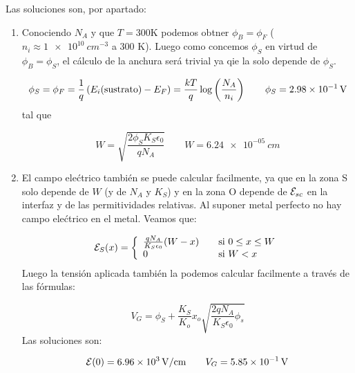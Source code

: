 \vspace*{1em}

Las soluciones son, por apartado:

\begin{enumerate}[label=\alph*)]
	\item Conociendo $N_A$ y que $T=300$K podemos obtner $\phi_B = \phi_F$ ($n_i \approx \SI{1e10}{cm^{-3}}$ a 300 K). Luego como concemos $\phi_S$ en virtud de $\phi_B = \phi_S$, el cálculo de la anchura será trivial ya qie la solo depende de $\phi_S$.

	      \begin{equation*}
		      \phi_S = \phi_F = \frac{1}{q} \left( E_i(\text{sustrato})-E_F \right) = \frac{kT}{q} \log \left( \frac{N_A}{n_i} \right) \qquad
		      \phi_{S} = \SI{2.98e-01}{V}
	      \end{equation*}
	      tal que

	      \begin{equation*}
		      W = \sqrt{\frac{2\phi_S K_S \epsilon_0}{qN_A}} \qquad
		      W = \SI{6.24e-05}{cm}
	      \end{equation*}

	\item El campo elećtrico también se puede calcular facilmente, ya que en la zona S solo depende de $W$ (y de $N_A$ y $K_{S}$) y en la zona O depende de $\mathcal{E}_{sc}$ en la interfaz y de las permitividades relativas. Al suponer metal perfecto no hay campo elećtrico en el metal. Veamos que:

	      \begin{equation*}
		      \mathcal{E}_S (x) = \left\lbrace \begin{array}{ll}
			      \frac{qN_A}{K_S \epsilon_0} (W-x) & \quad \text{si} \ 0\leq x \leq W \\
			      0                                 & \quad \text{si} \ W<x
		      \end{array} \right.
	      \end{equation*}
	      Luego la tensión aplicada también la podemos calcular facilmente a través de las fórmulas:

	      \begin{equation*}
		      V_G = \phi_S + \frac{K_S}{K_o} x_o \sqrt{\frac{2qN_A}{K_S\epsilon_0} \phi_s}
	      \end{equation*}
	      Las soluciones son:

	      \begin{equation*}
		      \mathcal{E}(0) = \SI{6.96e+03}{V/cm} \qquad
		      V_G = \SI{5.85e-01}{V}
	      \end{equation*}


\end{enumerate}

